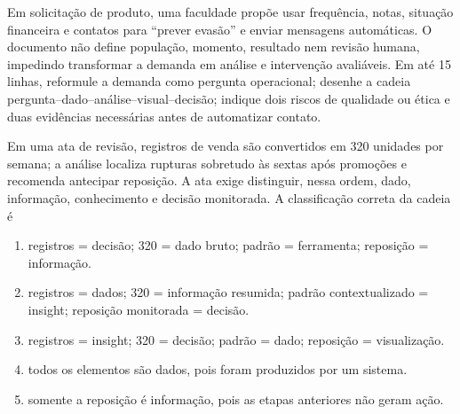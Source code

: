 
\TextoBase Em solicitação de produto, uma faculdade propõe usar frequência, notas, situação financeira e contatos para ``prever evasão'' e enviar mensagens automáticas. O documento não define população, momento, resultado nem revisão humana, impedindo transformar a demanda em análise e intervenção avaliáveis.
\FonteDidatica
\Comando Em até 15 linhas, reformule a demanda como pergunta operacional; desenhe a cadeia pergunta--dado--análise--visual--decisão; indique dois riscos de qualidade ou ética e duas evidências necessárias antes de automatizar contato.

\TextoBase Em uma ata de revisão, registros de venda são convertidos em 320 unidades por semana; a análise localiza rupturas sobretudo às sextas após promoções e recomenda antecipar reposição. A ata exige distinguir, nessa ordem, dado, informação, conhecimento e decisão monitorada.
\FonteDidatica
\Comando A classificação correta da cadeia é
\begin{enumerate}[label=\Alph*)]
\item registros = decisão; 320 = dado bruto; padrão = ferramenta; reposição = informação.
\item registros = dados; 320 = informação resumida; padrão contextualizado = insight; reposição monitorada = decisão.
\item registros = insight; 320 = decisão; padrão = dado; reposição = visualização.
\item todos os elementos são dados, pois foram produzidos por um sistema.
\item somente a reposição é informação, pois as etapas anteriores não geram ação.
\end{enumerate}

\TextoBase

